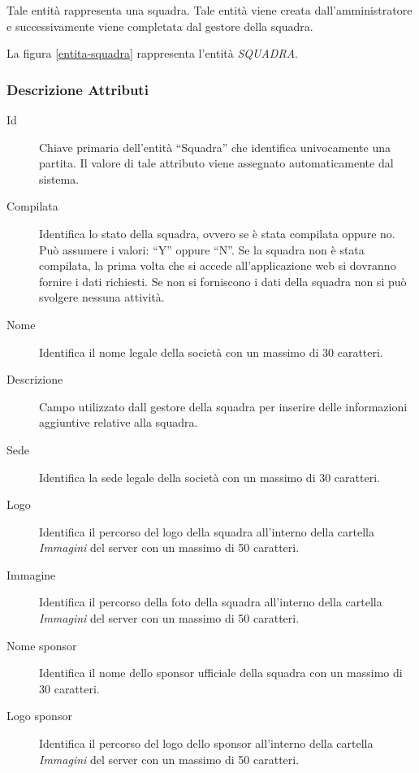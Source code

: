		Tale entità rappresenta una squadra. Tale entità viene creata dall'amministratore e successivamente viene completata dal gestore della squadra.
		
		La figura \ref{entita-squadra} rappresenta l'entità \emph{SQUADRA}.
		
		\subsubsection*{Descrizione Attributi}
		
		\begin{description}
			
			\item[Id]
			Chiave primaria dell'entità ``Squadra'' che identifica univocamente una partita. Il valore di tale attributo viene assegnato automaticamente dal sistema.
			
			\item[Compilata]
			Identifica lo stato della squadra, ovvero se è stata compilata oppure no. Può assumere i valori: ``Y'' oppure ``N''. Se la squadra non è stata compilata, la prima volta che si accede all'applicazione web si dovranno fornire i dati richiesti. Se non si forniscono i dati della squadra non si può svolgere nessuna attività.
			
			\item[Nome]
			Identifica il nome legale della società con un massimo di 30 caratteri.
			
			\item[Descrizione]
			Campo utilizzato dall gestore della squadra per inserire delle informazioni aggiuntive relative alla squadra.
			
			\item[Sede]
			Identifica la sede legale della società con un massimo di 30 caratteri.
			
			\item[Logo]
			Identifica il percorso del logo della squadra all'interno della cartella \emph{Immagini} del server con un massimo di 50 caratteri.
			
			\item[Immagine]
			Identifica il percorso della foto della squadra all'interno della cartella \emph{Immagini} del server con un massimo di 50 caratteri.
			
			\item[Nome sponsor]
			Identifica il nome dello sponsor ufficiale della squadra con un massimo di 30 caratteri.
			
			\item[Logo sponsor]
			Identifica il percorso del logo dello sponsor all'interno della cartella \emph{Immagini} del server con un massimo di 50 caratteri.
			
		\end{description}
		
